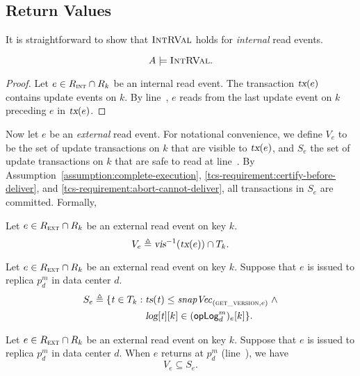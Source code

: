 
\subsection{Return Values} \label{ss:rval}

It is straightforward to show that $\textsc{IntRVal}$ holds
for \emph{internal} read events.
\begin{apptheorem} \label{thm:intretval}
  \[
    A \models \textsc{IntRVal}.
  \]
\end{apptheorem}

\begin{proof} \label{proof:intretval}
  Let $e \in R_{\textsc{int}} \cap R_{k}$ be an internal read event.
  The transaction $\textsl{tx}(e)$ contains update events on $k$.
  By line~\code{\ref{alg:unistore-coord}}{\ref{line:doread-return-from-buffer}},
  $e$ reads from the last update event on $k$
  preceding $e$ in $\textsl{tx}(e)$.
\end{proof}

Now let $e$ be an \emph{external} read event.
For notational convenience,
we define $V_{e}$ to be the set of update transactions on $k$
that are visible to $\textsl{tx}(e)$,
and $S_{e}$ the set of update transactions on $k$ that are safe to read
at line~\code{\ref{alg:unistore-replica}}{\ref{line:readkey-read}}.
By Assumption~\ref{assumption:complete-execution},
\ref{tcs-requirement:certify-before-deliver}, and
\ref{tcs-requirement:abort-cannot-deliver},
all transactions in $S_{e}$ are committed.
Formally,

\begin{appdefinition}
  \label{def:visible-set-tx}
  Let $e \in R_{\textsc{ext}} \cap R_{k}$ be an external read event on key $k$.
  \[
    V_{e} \triangleq \textsl{vis}^{-1}(\textsl{tx}(e)) \cap T_{k}.
  \]
\end{appdefinition}

\begin{appdefinition}
  \label{def:safe-set-tx}
  Let $e \in R_{\textsc{ext}} \cap R_{k}$ be an external read event on key $k$.
  Suppose that $e$ is issued to replica $p^{m}_{d}$ in data center $d$.
  \begin{align*}
    S_{e} \triangleq \{\mathit{t} \in T_{k}:
      &\; \textsl{ts}(\mathit{t}) \le \mathit{snapVec}_{(\textsc{get\_version}, e)}\; \land \\
      &\; \textsl{log}[\mathit{t}][k] \in ({\sf opLog}^{m}_{d})_{e}[k]\}.
  \end{align*}
\end{appdefinition}

\begin{applemma} \label{lemma:visible-safe-tx}
  Let $e \in R_{\textsc{ext}} \cap R_{k}$ be an external read event on key $k$.
  Suppose that $e$ is issued to replica $p^{m}_{d}$ in data center $d$.
  When $e$ returns at $p^{m}_{d}$
  (line~\code{\ref{alg:unistore-replica}}{\ref{line:readkey-read}}),
  we have
  \[
    V_{e} \subseteq S_{e}.
  \]
\end{applemma}

